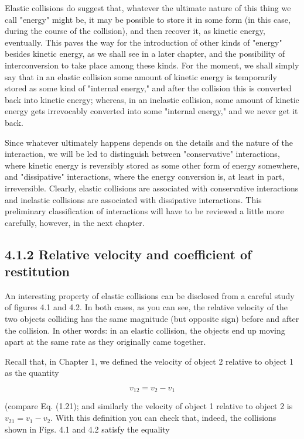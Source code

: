 \documentclass[10pt]{article}
\begin{document}
Elastic collisions do suggest that, whatever the ultimate nature of this thing we call "energy" might be, it may be possible to store it in some form (in this case, during the course of the collision), and then recover it, as kinetic energy, eventually. This paves the way for the introduction of other kinds of "energy" besides kinetic energy, as we shall see in a later chapter, and the possibility of interconversion to take place among these kinds. For the moment, we shall simply say that in an elastic collision some amount of kinetic energy is temporarily stored as some kind of "internal energy," and after the collision this is converted back into kinetic energy; whereas, in an inelastic collision, some amount of kinetic energy gets irrevocably converted into some "internal energy," and we never get it back.

Since whatever ultimately happens depends on the details and the nature of the interaction, we will be led to distinguish between "conservative" interactions, where kinetic energy is reversibly stored as some other form of energy somewhere, and "dissipative" interactions, where the energy conversion is, at least in part, irreversible. Clearly, elastic collisions are associated with conservative interactions and inelastic collisions are associated with dissipative interactions. This preliminary classification of interactions will have to be reviewed a little more carefully, however, in the next chapter.

\subsection*{4.1.2 Relative velocity and coefficient of restitution}
An interesting property of elastic collisions can be disclosed from a careful study of figures 4.1 and 4.2. In both cases, as you can see, the relative velocity of the two objects colliding has the same magnitude (but opposite sign) before and after the collision. In other words: in an elastic collision, the objects end up moving apart at the same rate as they originally came together.

Recall that, in Chapter 1, we defined the velocity of object 2 relative to object 1 as the quantity


\begin{equation*}
v_{12}=v_{2}-v_{1} \tag{4.3}
\end{equation*}


(compare Eq. (1.21); and similarly the velocity of object 1 relative to object 2 is $v_{21}=v_{1}-v_{2}$. With this definition you can check that, indeed, the collisions shown in Figs. 4.1 and 4.2 satisfy the equality
\end{document}
